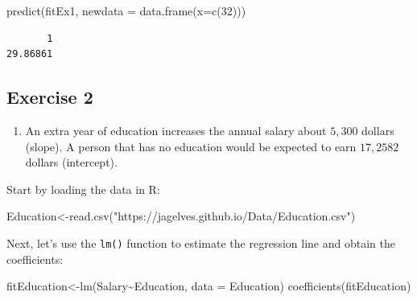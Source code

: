 \documentclass[
  letterpaper,
  DIV=11,
  numbers=noendperiod]{scrreprt}
\newenvironment{Shaded}{\begin{snugshade}}{\end{snugshade}}
\newcommand{\AttributeTok}[1]{\textcolor[rgb]{0.40,0.45,0.13}{#1}}
\newcommand{\DecValTok}[1]{\textcolor[rgb]{0.68,0.00,0.00}{#1}}
\newcommand{\FunctionTok}[1]{\textcolor[rgb]{0.28,0.35,0.67}{#1}}
\newcommand{\NormalTok}[1]{\textcolor[rgb]{0.00,0.23,0.31}{#1}}
\newcommand{\OtherTok}[1]{\textcolor[rgb]{0.00,0.23,0.31}{#1}}
\newcommand{\SpecialCharTok}[1]{\textcolor[rgb]{0.37,0.37,0.37}{#1}}
\newcommand{\StringTok}[1]{\textcolor[rgb]{0.13,0.47,0.30}{#1}}
\providecommand{\tightlist}{%
  \setlength{\itemsep}{0pt}\setlength{\parskip}{0pt}}\usepackage{longtable,booktabs,array}
\begin{document}
\begin{Shaded}
\begin{Highlighting}[numbers=left,,]
\FunctionTok{predict}\NormalTok{(fitEx1, }\AttributeTok{newdata =} \FunctionTok{data.frame}\NormalTok{(}\AttributeTok{x=}\FunctionTok{c}\NormalTok{(}\DecValTok{32}\NormalTok{)))}
\end{Highlighting}
\end{Shaded}

\begin{verbatim}
       1 
29.86861 
\end{verbatim}

\hypertarget{exercise-2-13}{%
\subsection*{Exercise 2}\label{exercise-2-13}}

\begin{blackbox}

\begin{enumerate}
\def\labelenumi{\arabic{enumi}.}
\tightlist
\item
  An extra year of education increases the annual salary about \(5,300\)
  dollars (slope). A person that has no education would be expected to
  earn \(17,2582\) dollars (intercept).
\end{enumerate}

\end{blackbox}

Start by loading the data in R:

\begin{Shaded}
\begin{Highlighting}[numbers=left,,]
\NormalTok{Education}\OtherTok{\textless{}{-}}\FunctionTok{read.csv}\NormalTok{(}\StringTok{"https://jagelves.github.io/Data/Education.csv"}\NormalTok{)}
\end{Highlighting}
\end{Shaded}

Next, let's use the \texttt{lm()} function to estimate the regression
line and obtain the coefficients:

\begin{Shaded}
\begin{Highlighting}[numbers=left,,]
\NormalTok{fitEducation}\OtherTok{\textless{}{-}}\FunctionTok{lm}\NormalTok{(Salary}\SpecialCharTok{\textasciitilde{}}\NormalTok{Education, }\AttributeTok{data =}\NormalTok{ Education)}
\FunctionTok{coefficients}\NormalTok{(fitEducation)}
\end{Highlighting}
\end{Shaded}
\end{document}
